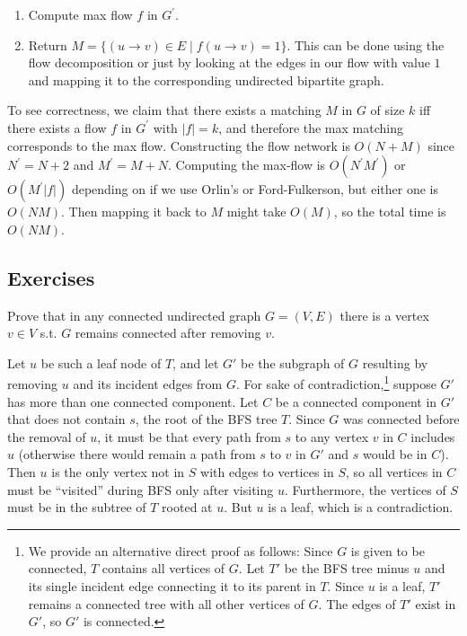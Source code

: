 \begin{example}
\begin{enumerate}
      \item Compute max flow $f$ in $G^\prime$. 
      \item Return $M = \{ (u \rightarrow v) \in E \mid f(u \rightarrow v) = 1 \}$. This can be done using the flow decomposition or just by looking at the edges in our flow with value $1$ and mapping it to the corresponding undirected bipartite graph. 
    \end{enumerate}
    To see correctness, we claim that there exists a matching $M$ in $G$ of size $k$ iff there exists a flow $f$ in $G^\prime$ with $|f|= k$, and therefore the max matching corresponds to the max flow. Constructing the flow network is $O(N + M)$ since $N^\prime = N + 2$ and $M^\prime = M + N$. Computing the max-flow is $O(N^\prime M^\prime)$ or $O(M^\prime |f|)$ depending on if we use Orlin's or Ford-Fulkerson, but either one is $O(NM)$. Then mapping it back to $M$ might take $O(M)$, so the total time is $O(NM)$. 
  \end{example}

\subsection{Exercises}

  \begin{exercise}
    Prove that in any connected undirected graph $G = (V, E)$ there is a vertex $v \in V$ s.t. $G$ remains connected after removing $v$. 
  \end{exercise}
  \begin{solution}
    Let $u$ be such a leaf node of $T$, and let $G'$ be the subgraph of $G$ resulting by removing $u$ and its incident edges from $G$.
    For sake of contradiction,\footnote{We provide an alternative direct proof as follows: Since $G$ is given to be connected, $T$ contains all vertices of $G$. Let $T'$ be the BFS tree minus $u$ and its single incident edge connecting it to its parent in $T$. Since $u$ is a leaf, $T'$ remains a connected tree with all other vertices of $G$. The edges of $T'$ exist in $G'$, so $G'$ is connected.} suppose $G'$ has more than one connected component.
    Let $C$ be a connected component in $G'$ that does not contain $s$, the root of the BFS tree $T$.
    Since $G$ was connected before the removal of $u$, it must be that every path from $s$ to any vertex $v$ in $C$ includes $u$ (otherwise there would remain a path from $s$ to $v$ in $G'$ and $s$ would be in $C$).
    Then $u$ is the only vertex not in $S$ with edges to vertices in $S$, so all vertices in $C$ must be ``visited'' during BFS only after visiting $u$. Furthermore, the vertices of $S$ must be in the subtree of $T$ rooted at $u$. But $u$ is a leaf, which is a contradiction.
  \end{solution}

